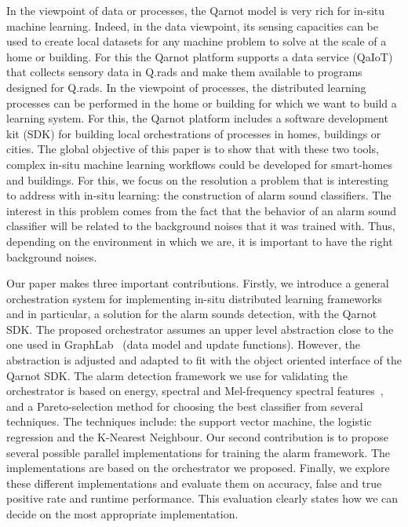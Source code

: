 \documentclass[10pt, conference, compsocconf]{IEEEtran}
\begin{document}
In the viewpoint of data or processes, the Qarnot model is very rich for in-situ machine learning. Indeed, in the data viewpoint, 
its sensing capacities can be used to create local datasets for any machine problem to solve at the scale of a home or building. 
For this the Qarnot platform supports a data service (QaIoT) that collects sensory data in Q.rads 
and make them available to programs designed for Q.rads. 
In the viewpoint of processes, the distributed learning processes can be performed in the home or building for which we want to 
build a learning system. For this, the Qarnot platform includes a software development kit (SDK) for building local orchestrations 
of processes in homes, buildings or cities.
The global objective of this paper is to show that with these two tools, 
complex in-situ machine learning workflows could be developed for smart-homes and buildings. For this, we focus on the resolution 
a problem that is interesting to address with in-situ learning: the construction of alarm sound classifiers. 
The interest in this problem comes from the fact that the behavior of an alarm sound classifier will be related to the background noises that 
it was trained with. Thus, depending on the environment in which we are, it is important to have the right background noises.

Our paper makes three important contributions. Firstly, we introduce a general orchestration system for implementing in-situ 
distributed learning frameworks and in particular, a solution for the alarm sounds detection, with the Qarnot SDK. 
The proposed orchestrator assumes an upper level abstraction close to the one used in GraphLab~\cite{Low:2012:DGF:2212351.2212354} (data model 
and update functions). However, the abstraction is adjusted and adapted to fit with the object oriented interface 
of the Qarnot SDK. 
The alarm detection framework we use for validating the orchestrator is based on energy, spectral and Mel-frequency spectral features~\cite{Davis:1990:CPR:108235.108239}, \cite{pyAudioAnalysis}
and a Pareto-selection method for choosing the best classifier from several techniques. The techniques include: the support vector 
machine, the logistic regression and the K-Nearest Neighbour. Our second contribution is to propose several possible parallel 
implementations for training the alarm framework. The implementations are based on the orchestrator we proposed.  
Finally, we explore these different implementations and evaluate them on accuracy, 
false and true positive rate and runtime performance. This evaluation clearly states how we can decide on the most appropriate 
implementation.
\end{document}
